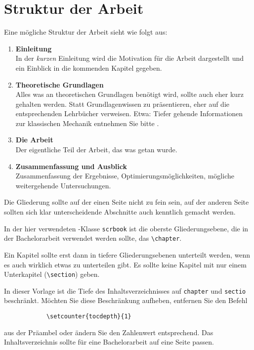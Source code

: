 \chapter{Struktur der Arbeit}

Eine mögliche Struktur der Arbeit sieht wie folgt aus:

\begin{enumerate}
    \item \textbf{Einleitung}\\
        In der \emph{kurzen} Einleitung wird die Motivation für die Arbeit
        dargestellt und ein Einblick in die kommenden Kapitel gegeben.
    \item \textbf{Theoretische Grundlagen}\\
        Alles was an theoretischen Grundlagen benötigt wird, sollte auch eher kurz gehalten werden.
        Statt Grundlagenwissen zu präsentieren, eher auf die entsprechenden Lehrbücher verweisen.
        Etwa: Tiefer gehende Informationen zur klassischen Mechanik entnehmen Sie bitte \cite{kuypers}.
    \item \textbf{Die Arbeit} \\
        Der eigentliche Teil der Arbeit, das was getan wurde.
    \item \textbf{Zusammenfassung und Ausblick} \\
        Zusammenfassung der Ergebnisse, Optimierungsmöglichkeiten, mögliche weitergehende Untersuchungen.
\end{enumerate}

Die Gliederung sollte auf der einen Seite nicht zu fein sein, auf der anderen Seite
sollten sich klar unterscheidende Abschnitte auch kenntlich gemacht werden.

In der hier verwendeten \KOMAScript-Klasse \texttt{scrbook} ist die oberste Gliederungsebene,
die in der Bachelorarbeit verwendet werden sollte, das \texttt{\textbackslash chapter}.

Ein Kapitel sollte erst dann in tiefere Gliederungsebenen unterteilt werden, wenn es auch wirklich etwas zu unterteilen gibt. Es sollte keine Kapitel mit nur einem Unterkapitel (\texttt{\textbackslash section}) geben.

In dieser Vorlage ist die Tiefe des Inhaltsverzeichnisses auf \texttt{chapter} und \texttt{sectio} beschränkt. Möchten Sie diese Beschränkung aufheben, entfernen Sie den Befehl
\begin{verbatim}
            \setcounter{tocdepth}{1}
\end{verbatim}
aus der Präambel oder ändern Sie den Zahlenwert entsprechend. Das Inhaltsverzeichnis sollte für eine Bachelorarbeit auf eine Seite passen.
